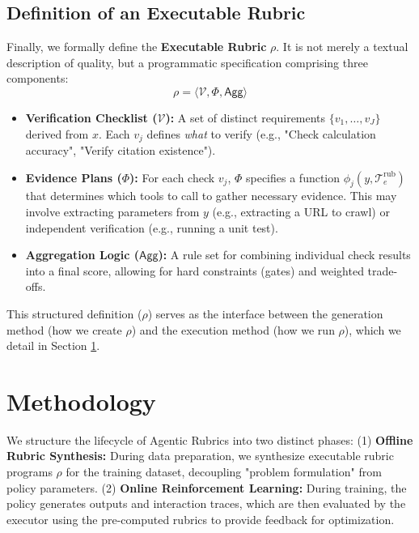 \subsection{Definition of an Executable Rubric}
\label{sec:rubric_def}

Finally, we formally define the \textbf{Executable Rubric} $\rho$.
It is not merely a textual description of quality, but a programmatic specification comprising three components:
\begin{equation}
\rho = \langle \mathcal{V}, \Phi, \mathsf{Agg} \rangle
\end{equation}
\begin{itemize}
    \item \textbf{Verification Checklist ($\mathcal{V}$):} A set of distinct requirements $\{v_1, \dots, v_J\}$ derived from $x$. Each $v_j$ defines \textit{what} to verify (e.g., "Check calculation accuracy", "Verify citation existence").
    \item \textbf{Evidence Plans ($\Phi$):} For each check $v_j$, $\Phi$ specifies a function $\phi_j(y, \mathcal{T}_e^{\text{rub}})$ that determines which tools to call to gather necessary evidence. This may involve extracting parameters from $y$ (e.g., extracting a URL to crawl) or independent verification (e.g., running a unit test).
    \item \textbf{Aggregation Logic ($\mathsf{Agg}$):} A rule set for combining individual check results into a final score, allowing for hard constraints (gates) and weighted trade-offs.
\end{itemize}

This structured definition ($\rho$) serves as the interface between the generation method (how we create $\rho$) and the execution method (how we run $\rho$), which we detail in Section \ref{sec:method}.

\section{Methodology}
\label{sec:method}

We structure the lifecycle of Agentic Rubrics into two distinct phases:
(1) \textbf{Offline Rubric Synthesis:} During data preparation, we synthesize executable rubric programs $\rho$ for the training dataset, decoupling "problem formulation" from policy parameters.
(2) \textbf{Online Reinforcement Learning:} During training, the policy generates outputs and interaction traces, which are then evaluated by the executor using the pre-computed rubrics to provide feedback for optimization.

